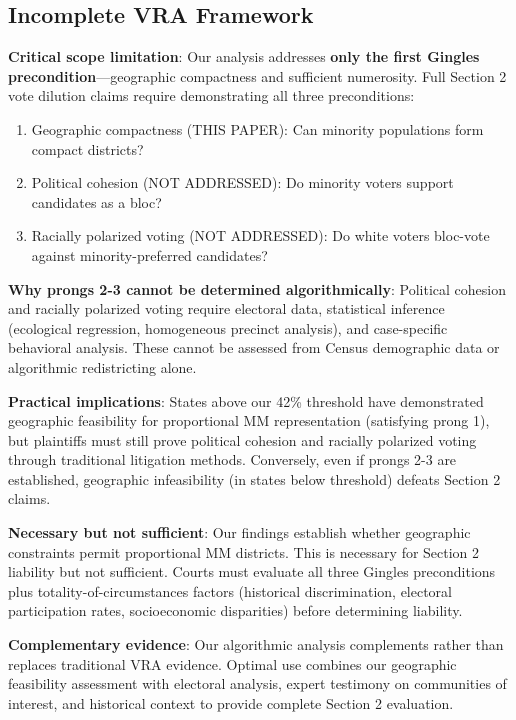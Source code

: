 \subsection{Incomplete VRA Framework}

\textbf{Critical scope limitation}: Our analysis addresses \textbf{only the first Gingles precondition}---geographic compactness and sufficient numerosity. Full Section 2 vote dilution claims require demonstrating all three preconditions:

\begin{enumerate}
    \item Geographic compactness (THIS PAPER): Can minority populations form compact districts?
    \item Political cohesion (NOT ADDRESSED): Do minority voters support candidates as a bloc?
    \item Racially polarized voting (NOT ADDRESSED): Do white voters bloc-vote against minority-preferred candidates?
\end{enumerate}

\textbf{Why prongs 2-3 cannot be determined algorithmically}: Political cohesion and racially polarized voting require electoral data, statistical inference (ecological regression, homogeneous precinct analysis), and case-specific behavioral analysis. These cannot be assessed from Census demographic data or algorithmic redistricting alone.

\textbf{Practical implications}: States above our 42\% threshold have demonstrated geographic feasibility for proportional MM representation (satisfying prong 1), but plaintiffs must still prove political cohesion and racially polarized voting through traditional litigation methods. Conversely, even if prongs 2-3 are established, geographic infeasibility (in states below threshold) defeats Section 2 claims.

\textbf{Necessary but not sufficient}: Our findings establish whether geographic constraints permit proportional MM districts. This is necessary for Section 2 liability but not sufficient. Courts must evaluate all three Gingles preconditions plus totality-of-circumstances factors (historical discrimination, electoral participation rates, socioeconomic disparities) before determining liability.

\textbf{Complementary evidence}: Our algorithmic analysis complements rather than replaces traditional VRA evidence. Optimal use combines our geographic feasibility assessment with electoral analysis, expert testimony on communities of interest, and historical context to provide complete Section 2 evaluation.

